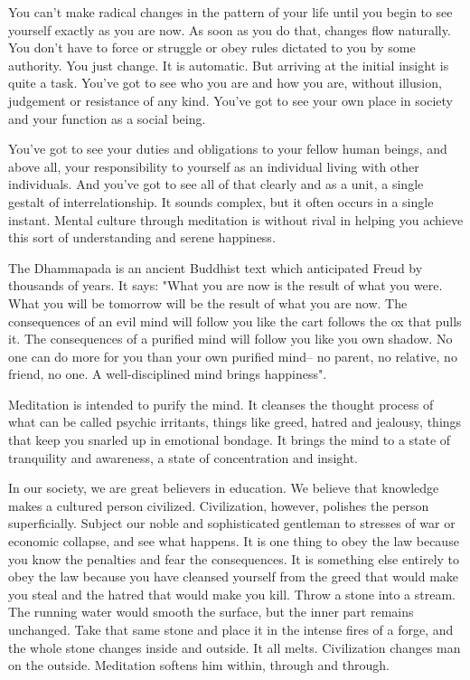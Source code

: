 You can't make radical changes in the pattern of your life until you begin to
see yourself exactly as you are now. As soon as you do that, changes flow
naturally. You don't have to force or struggle or obey rules dictated to you by
some authority. You just change. It is automatic. But arriving at the initial
insight is quite a task. You've got to see who you are and how you are, without
illusion, judgement or resistance of any kind. You've got to see your own place
in society and your function as a social being.

You've got to see your duties and obligations to your fellow human beings, and
above all, your responsibility to yourself as an individual living with other
individuals. And you've got to see all of that clearly and as a unit, a single
gestalt of interrelationship.  It sounds complex, but it often occurs in a
single instant. Mental culture through meditation is without rival in helping
you achieve this sort of understanding and serene happiness.

The Dhammapada is an ancient Buddhist text which anticipated Freud by thousands
of years. It says: "What you are now is the result of what you were. What you
will be tomorrow will be the result of what you are now. The consequences of an
evil mind will follow you like the cart follows the ox that pulls it. The
consequences of a purified mind will follow you like you own shadow. No one can
do more for you than your own purified mind-- no parent, no relative, no friend,
no one. A well-disciplined mind brings happiness".

Meditation is intended to purify the mind. It cleanses the thought process of
what can be called psychic irritants, things like greed, hatred and jealousy,
things that keep you snarled up in emotional bondage. It brings the mind to a
state of tranquility and awareness, a state of concentration and insight.

In our society, we are great believers in education. We believe that knowledge
makes a cultured person civilized. Civilization, however, polishes the person
superficially. Subject our noble and sophisticated gentleman to stresses of war
or economic collapse, and see what happens. It is one thing to obey the law
because you know the penalties and fear the consequences. It is something else
entirely to obey the law because you have cleansed yourself from the greed that
would make you steal and the hatred that would make you kill. Throw a stone into
a stream. The running water would smooth the surface, but the inner part remains
unchanged. Take that same stone and place it in the intense fires of a forge,
and the whole stone changes inside and outside. It all melts. Civilization
changes man on the outside. Meditation softens him within, through and through.

